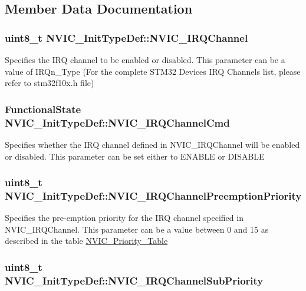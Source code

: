 \subsection{Member Data Documentation}
\hypertarget{structNVIC__InitTypeDef_afa04cf6e559bb690bdd9fcb7e3d93dcf}{
\subsubsection[{NVIC\_\-IRQChannel}]{\setlength{\rightskip}{0pt plus 5cm}uint8\_\-t {\bf NVIC\_\-InitTypeDef::NVIC\_\-IRQChannel}}}
\label{structNVIC__InitTypeDef_afa04cf6e559bb690bdd9fcb7e3d93dcf}
Specifies the IRQ channel to be enabled or disabled. This parameter can be a value of IRQn\_\-Type (For the complete STM32 Devices IRQ Channels list, please refer to stm32f10x.h file) \hypertarget{structNVIC__InitTypeDef_acb23fabb995fa4980c768825f12f5815}{
\subsubsection[{NVIC\_\-IRQChannelCmd}]{\setlength{\rightskip}{0pt plus 5cm}FunctionalState {\bf NVIC\_\-InitTypeDef::NVIC\_\-IRQChannelCmd}}}
\label{structNVIC__InitTypeDef_acb23fabb995fa4980c768825f12f5815}
Specifies whether the IRQ channel defined in NVIC\_\-IRQChannel will be enabled or disabled. This parameter can be set either to ENABLE or DISABLE \hypertarget{structNVIC__InitTypeDef_aa3fe262c30188404a6e31f922c5ae513}{
\subsubsection[{NVIC\_\-IRQChannelPreemptionPriority}]{\setlength{\rightskip}{0pt plus 5cm}uint8\_\-t {\bf NVIC\_\-InitTypeDef::NVIC\_\-IRQChannelPreemptionPriority}}}
\label{structNVIC__InitTypeDef_aa3fe262c30188404a6e31f922c5ae513}
Specifies the pre-\/emption priority for the IRQ channel specified in NVIC\_\-IRQChannel. This parameter can be a value between 0 and 15 as described in the table \hyperlink{group__NVIC__Priority__Table}{NVIC\_\-Priority\_\-Table} \hypertarget{structNVIC__InitTypeDef_aecc22a002244e3f1f9448dbe46c1db4b}{
\subsubsection[{NVIC\_\-IRQChannelSubPriority}]{\setlength{\rightskip}{0pt plus 5cm}uint8\_\-t {\bf NVIC\_\-InitTypeDef::NVIC\_\-IRQChannelSubPriority}}}
